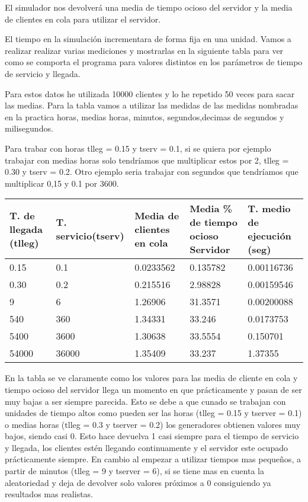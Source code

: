 \documentclass[]{article}
\begin{document}
El simulador nos devolverá una media de tiempo ocioso del servidor y la media de clientes en cola para utilizar el servidor. 

El tiempo en la simulación incrementara de forma fija en una unidad.
Vamos a realizar realizar varias mediciones y mostrarlas en la siguiente tabla para ver como se comporta el programa para valores distintos en los parámetros de tiempo de servicio y llegada. 

Para estos datos he utilizada 10000 clientes y lo he repetido 50 veces para sacar las medias.
Para la tabla vamos a utilizar las medidas de las medidas nombradas en la practica horas, medias horas, minutos, segundos,decimas de segundos y milisegundos.

Para trabar con horas tlleg = 0.15 y tserv = 0.1, si se quiera por ejemplo trabajar con medias horas solo tendríamos que multiplicar estos por 2, tlleg = 0.30 y tserv = 0.2. Otro ejemplo seria trabajar con segundos que tendríamos que multiplicar 0,15 y 0.1 por 3600.

\begin{table}[H]
	\begin{center}
		\begin{tabularx}{0.9\textwidth}{|X|X|X|X|X|}
			\hline
			\textbf{T. de llegada (tlleg)} & \textbf{T. servicio(tserv)}&\textbf{Media de clientes en cola} & \textbf{Media \% de tiempo ocioso Servidor} & \textbf{T. medio de ejecución (seg)} \\
			\hline \hline
			  0.15 & 0.1 & 0.0233562 & 0.135782 &0.00116736\\ \hline
			  0.30 & 0.2 & 0.215516 & 2.98828 &0.00159546 \\ \hline
			  9 & 6& 1.26906 &31.3571  &0.00200088\\ \hline
			  540 & 360 & 1.34331 & 33.246 &0.0173753\\ \hline
			  5400 & 3600 & 1.30638 & 33.5554 &0.150701\\ \hline
			  54000 & 36000 & 1.35409  & 33.237 & 1.37355 \\ \hline

		\end{tabularx}

	\end{center}
\end{table}

En la tabla se ve claramente como los valores para las media de cliente en cola y tiempo ocioso del servidor llega un momento en que prácticamente y pasan de ser muy bajas a ser siempre parecida. Esto se debe a que cunado se trabajan con unidades de tiempo altos como pueden ser las horas (tlleg = 0.15 y tserver = 0.1) o medias horas (tlleg = 0.3 y tserver = 0.2) los generadores obtienen valores muy bajos, siendo casi 0. Esto hace devuelva 1 casi siempre para el tiempo de servicio y llegada, los clientes estén llegando continuamente y el servidor este ocupado prácticamente siempre. En cambio al empezar a utilizar tiempos mas pequeños, a partir de minutos (tlleg = 9 y tserver = 6), si se tiene mas en cuenta la aleatoriedad y deja de devolver solo valores próximos a 0 consiguiendo ya resultados mas realistas.
\newline
\end{document}
